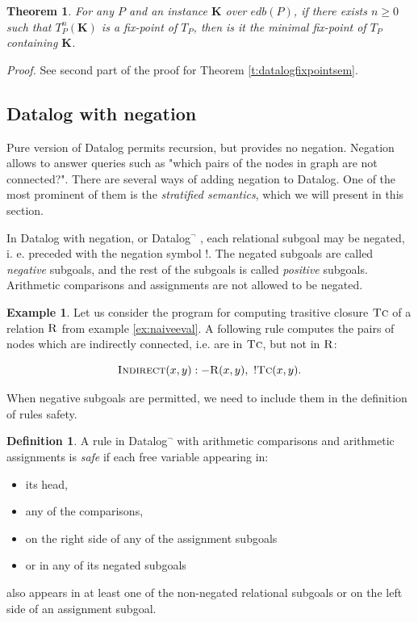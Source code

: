 \documentclass{pracamgr}
\theoremstyle{plain}
\newtheorem{thm}{Theorem}[section]
\theoremstyle{definition}
\newtheorem{defn}{Definition}[section]
\newtheorem{exmp}{Example}[section]
\theoremstyle{remark}
\newcommand{\datalogneg}{Datalog$^{\neg}$ }
\newcommand{\assign}{:-}
\newcommand{\relat}[2]{$\textsc{#1}#2$}
\begin{document}
\begin{thm}
For any $P$ and an instance $\textbf{K}$ over $edb(P)$, if there exists $n \ge 0$ such that $T_P^n(\textbf{K})$ is a fix-point of $T_P$, then is it the minimal fix-point of $T_P$ containing $\textbf{K}$.
\end{thm}
\emph{Proof.} See second part of the proof for Theorem \ref{t:datalogfixpointsem}.

\subsection{Datalog with negation}
Pure version of Datalog permits recursion, but provides no negation. Negation allows to answer queries such as "which pairs of the nodes in graph are not connected?". There are several ways of adding negation to Datalog. One of the most prominent of them is the \emph{stratified semantics}, which we will present in this section. 

In Datalog with negation, or \datalogneg, each relational subgoal may be negated, i. e. preceded with the negation symbol $!$. The negated subgoals are called \emph{negative} subgoals, and the rest of the subgoals is called \emph{positive} subgoals. Arithmetic comparisons and assignments are not allowed to be negated.

\begin{exmp}
Let us consider the program for computing trasitive closure \relat{Tc}{} of a relation \relat{R}{} from example \ref{ex:naiveeval}. A following rule computes the pairs of nodes which are indirectly connected, i.e. are in \relat{Tc}{}, but not in \relat{R}{}:

$$\textsc{Indirect}(x, y) \assign \textsc{R}(x, y),~!\textsc{Tc}(x, y).$$
\end{exmp}

When negative subgoals are permitted, we need to include them in the definition of rules safety. 

\begin{defn}
A rule in \datalogneg with arithmetic comparisons and arithmetic assignments is \emph{safe} if each free variable appearing in:
\begin{itemize}
\item its head,
\item any of the comparisons,
\item on the right side of any of the assignment subgoals
\item or in any of its negated subgoals
\end{itemize}
also appears in at least one of the non-negated relational subgoals or on the left side of an assignment subgoal.
\end{defn}\label{d:datalogeqsaferule}
\end{document}
